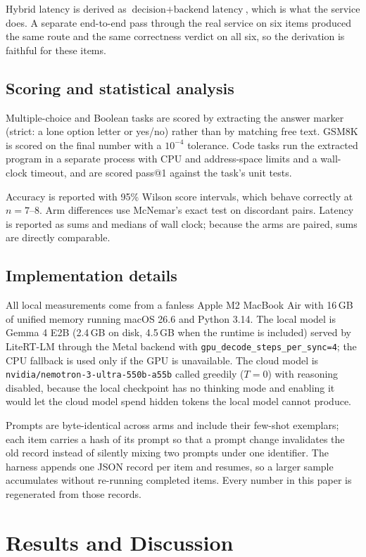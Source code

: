 \documentclass[11pt,a4paper]{article}
\begin{document}
Hybrid latency is derived as $\text{decision} + \text{backend latency}$, which
is what the service does. A separate end-to-end pass through the real service
on six items produced the same route and the same correctness verdict on all
six, so the derivation is faithful for these items.

\subsection{Scoring and statistical analysis}
Multiple-choice and Boolean tasks are scored by extracting the answer marker
(strict: a lone option letter or yes/no) rather than by matching free text.
GSM8K is scored on the final number with a $10^{-4}$ tolerance. Code tasks run
the extracted program in a separate process with CPU and address-space limits
and a wall-clock timeout, and are scored pass@1 against the task's unit tests.

Accuracy is reported with 95\% Wilson score intervals, which behave correctly
at $n=7$--$8$. Arm differences use McNemar's exact test on discordant pairs.
Latency is reported as sums and medians of wall clock; because the arms are
paired, sums are directly comparable.

\subsection{Implementation details}
All local measurements come from a fanless Apple M2 MacBook Air with 16\,GB of
unified memory running macOS 26.6 and Python 3.14. The local model is Gemma 4
E2B (2.4\,GB on disk, 4.5\,GB when the runtime is included) served by
LiteRT-LM through the Metal backend with \texttt{gpu\_decode\_steps\_per\_sync=4};
the CPU fallback is used only if the GPU is unavailable. The cloud model is
\texttt{nvidia/nemotron-3-ultra-550b-a55b} called greedily
($T=0$) with reasoning disabled, because the local checkpoint has no thinking
mode and enabling it would let the cloud model spend hidden tokens the local
model cannot produce.

Prompts are byte-identical across arms and include their few-shot exemplars;
each item carries a hash of its prompt so that a prompt change invalidates the
old record instead of silently mixing two prompts under one identifier. The
harness appends one JSON record per item and resumes, so a larger sample
accumulates without re-running completed items. Every number in this paper is
regenerated from those records.

\section{Results and Discussion}
\end{document}
